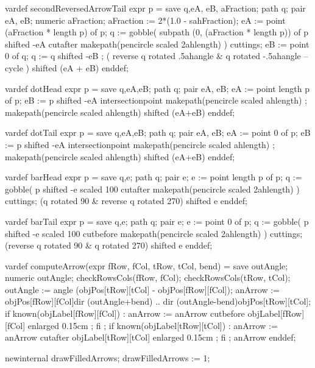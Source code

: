   vardef secondReversedArrowTail expr p =
    save q,eA, eB, aFraction; path q;
    pair eA, eB; numeric aFraction;
    aFraction := 2*(1.0 - sahFraction);
    eA := point (aFraction * length p) of p;
    q := gobble(
      subpath (0, (aFraction * length p)) of p shifted -eA
      cutafter makepath(pencircle scaled 2ahlength)
    ) cuttings;
    eB := point 0 of q;
    q := q shifted -eB ;
    (
      reverse q rotated .5ahangle &
      q rotated -.5ahangle --
      cycle
    ) shifted (eA + eB)
  enddef;
  
  
  vardef dotHead expr p =
    save q,eA,eB; path q; pair eA, eB;
    eA := point length p of p;
    eB :=
      p shifted -eA
      intersectionpoint makepath(pencircle scaled ahlength) ;
    makepath(pencircle scaled ahlength) shifted (eA+eB)
  enddef;
  
  vardef dotTail expr p =
    save q,eA,eB; path q; pair eA, eB;
    eA := point 0 of p;
    eB :=
      p shifted -eA
      intersectionpoint makepath(pencircle scaled ahlength) ;
    makepath(pencircle scaled ahlength) shifted (eA+eB)
  enddef;

  
  vardef barHead expr p =
    save q,e; path q; pair e;
    e := point length p of p;
    q := gobble(
      p shifted -e scaled 100
      cutafter makepath(pencircle scaled 2ahlength)
    ) cuttings;
    (q rotated 90 & reverse q rotated 270) shifted e
  enddef;

  vardef barTail expr p =
    save q,e; path q; pair e;
    e := point 0 of p;
    q := gobble(
      p shifted -e scaled 100
      cutbefore makepath(pencircle scaled 2ahlength)
    ) cuttings;
    (reverse q rotated 90 & q rotated 270) shifted e
  enddef;

  vardef computeArrow(expr fRow, fCol, tRow, tCol, bend) =
    save outAngle;
    numeric outAngle;
    checkRowsCols(fRow, fCol);
    checkRowsCols(tRow, tCol);
    outAngle :=
      angle (objPos[tRow][tCol] - objPos[fRow][fCol]);
    anArrow := 
      objPos[fRow][fCol]{dir (outAngle+bend)} .. 
      {dir (outAngle-bend)}objPos[tRow][tCol];
    if known(objLabel[fRow][fCol]) :
      anArrow :=
        anArrow cutbefore
        objLabel[fRow][fCol] enlarged 0.15cm ;
    fi ;
    if known(objLabel[tRow][tCol]) :
      anArrow :=
        anArrow cutafter
        objLabel[tRow][tCol] enlarged 0.15cm ;
    fi ;
    anArrow
  enddef;

  newinternal drawFilledArrows;
  drawFilledArrows := 1;
  
